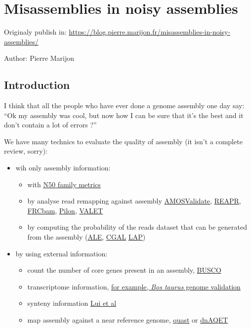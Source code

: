 \documentclass[./main.tex]{subfiles}
\begin{document}
\section{Misassemblies in noisy assemblies}

Originaly publish in: \url{https://blog.pierre.marijon.fr/misassemblies-in-noisy-assemblies/}

Author: Pierre Marijon

\subsection{Introduction}

I think that all the people who have ever done a genome assembly one day
say: ``Ok my assembly was cool, but now how I can be sure that it's the
best and it don't contain a lot of errors ?''

We have many technics to evaluate the quality of assembly (it isn't a
complete review, sorry):
\begin{itemize}
    \item wih only assembly information:
    \begin{itemize}
        \item with \href{https://doi.org/10.1089/cmb.2017.0013}{N50 family metrics}
        \item by analyse read remapping against assembly \href{http://amos.sourceforge.net/wiki/index.php/Amosvalidate}{AMOSValidate}, \href{https://www.sanger.ac.uk/science/tools/reapr}{REAPR}, \href{https://github.com/vezzi/FRC_align}{FRCbam}, \href{https://github.com/broadinstitute/pilon/wiki}{Pilon}, \href{https://www.cbcb.umd.edu/software/valet}{VALET}
        \item by computing the probability of the reads dataset that can be generated from the assembly (\href{https://doi.org/10.1093/bioinformatics/bts723}{ALE}, \href{https://doi.org/10.1186/gb-2013-14-1-r8}{CGAL} \href{https://doi.org/10.1186/1756-0500-6-334}{LAP})
        \end{itemize}
    \item by using external information: 
    \begin{itemize}
        \item count the number of core genes present in an assembly, \href{https://busco.ezlab.org/}{BUSCO}
        \item transcriptome information, \href{https://doi.org/10.1186/gb-2009-10-4-r42}{for example, \emph{Bos taurus} genome validation}
        \item synteny information \href{https://doi.org/10.1186/s12859-018-2026-4}{Lui et al}
        \item map assembly against a near reference genome, \href{https://doi.org/10.1093/bioinformatics/btt086}{quast} or \href{https://bmcgenomics.biomedcentral.com/articles/10.1186/s12864-019-6070-x}{dnAQET}
    \end{itemize}
\end{itemize}
\end{document}
